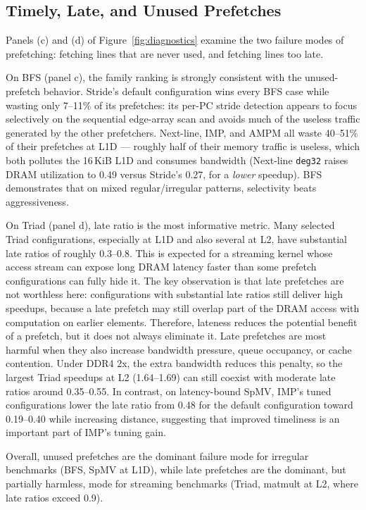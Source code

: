 \documentclass[12pt, letterpaper]{article}
\begin{document}
\subsection{Timely, Late, and Unused Prefetches}
\label{sec:res:timely-late-unused}

Panels (c) and (d) of Figure~\ref{fig:diagnostics} examine the two failure modes of prefetching: fetching lines that are never used, and fetching lines too late.

\noindent On BFS (panel c), the family ranking is strongly consistent with the unused-prefetch behavior. Stride's default configuration wins every BFS case while wasting only 7--11\% of its prefetches: its per-PC stride detection appears to focus selectively on the sequential edge-array scan and avoids much of the useless traffic generated by the other prefetchers. Next-line, IMP, and AMPM all waste 40--51\% of their prefetches at L1D --- roughly half of their memory traffic is useless, which both pollutes the 16\,KiB L1D and consumes bandwidth (Next-line \texttt{deg32} raises DRAM utilization to 0.49 versus Stride's 0.27, for a \emph{lower} speedup). BFS demonstrates that on mixed regular/irregular patterns, selectivity beats aggressiveness.

\noindent On Triad (panel d), late ratio is the most informative metric. Many selected Triad configurations, especially at L1D and also several at L2, have substantial late ratios of roughly 0.3--0.8. This is expected for a streaming kernel whose access stream can expose long DRAM latency faster than some prefetch configurations can fully hide it. The key observation is that late prefetches are not worthless here: configurations with substantial late ratios still deliver high speedups, because a late prefetch may still overlap part of the DRAM access with computation on earlier elements. Therefore, lateness reduces the potential benefit of a prefetch, but it does not always eliminate it. Late prefetches are most harmful when they also increase bandwidth pressure, queue occupancy, or cache contention. Under DDR4 2x, the extra bandwidth reduces this penalty, so the largest Triad speedups at L2 (1.64--1.69) can still coexist with moderate late ratios around 0.35--0.55. In contrast, on latency-bound SpMV, IMP's tuned configurations lower the late ratio from 0.48 for the default configuration toward 0.19--0.40 while increasing distance, suggesting that improved timeliness is an important part of IMP's tuning gain.

\noindent Overall, unused prefetches are the dominant failure mode for irregular benchmarks (BFS, SpMV at L1D), while late prefetches are the dominant, but partially harmless, mode for streaming benchmarks (Triad, matmult at L2, where late ratios exceed 0.9).
\end{document}
